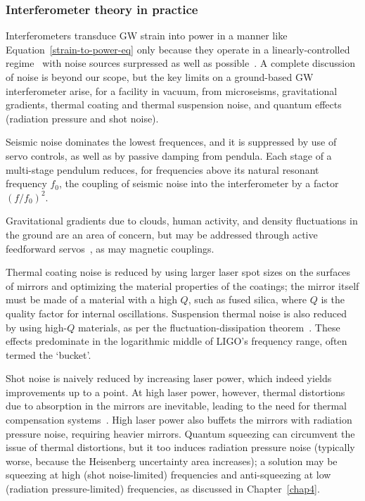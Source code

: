             \subsubsection{Interferometer theory in practice}
            \label{interferometer_theory}

Interferometers transduce GW strain into power in a manner like Equation~\ref{strain-to-power-eq} only because they operate in a linearly-controlled regime~\cite{FrickeThesis} with noise sources surpressed as well as possible~\cite{Saulson,LIGOWorks}.
A complete discussion of noise is beyond our scope, but the key limits on a ground-based GW interferometer arise, for a facility in vacuum, from microseisms, gravitational gradients, thermal coating and thermal suspension noise, and quantum effects (radiation pressure and shot noise).

Seismic noise dominates the lowest frequences, and it is suppressed by use of servo controls, as well as by passive damping from pendula.
Each stage of a multi-stage pendulum reduces, for frequencies above its natural resonant frequency $f_0$, the coupling of seismic noise into the interferometer by a factor $(f/f_0)^2$.

Gravitational gradients due to clouds, human activity, and density fluctuations in the ground are an area of concern, but may be addressed through active feedforward servos~\cite{Driggers2012ActiveNoise}, as may magnetic couplings.

Thermal coating noise is reduced by using larger laser spot sizes on the surfaces of mirrors and optimizing the material properties of the coatings; the mirror itself must be made of a material with a high $Q$, such as fused silica, where $Q$ is the quality factor for internal oscillations.
Suspension thermal noise is also reduced by using high-$Q$ materials, as per the fluctuation-dissipation theorem~\cite{Saulson}.
These effects predominate in the logarithmic middle of LIGO's frequency range, often termed the `bucket'.

Shot noise is naively reduced by increasing laser power, which indeed yields improvements up to a point.
At high laser power, however, thermal distortions due to absorption in the mirrors are inevitable, leading to the need for thermal compensation systems~\cite{BallmerThesis}.
High laser power also buffets the mirrors with radiation pressure noise, requiring heavier mirrors.
Quantum squeezing can circumvent the issue of thermal distortions, but it too induces radiation pressure noise (typically worse, because the Heisenberg uncertainty area increases); a solution may be squeezing at high (shot noise-limited) frequencies and anti-squeezing at low (radiation pressure-limited) frequencies, as discussed in Chapter~\ref{chap4}.

